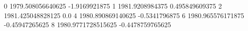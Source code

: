0 1979.508056640625 -1.9169921875
1 1981.9208984375 0.495849609375
2 1981.425048828125 0.0
4 1980.890869140625 -0.5341796875
6 1980.965576171875 -0.45947265625
8 1980.9771728515625 -0.4478759765625
